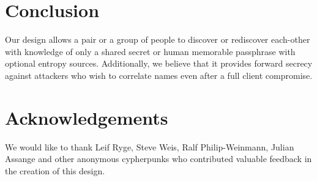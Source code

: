 \documentclass[letterpaper,twocolumn,10pt]{article}
\begin{document}
\section{Conclusion}

Our design allows a pair or a group of people to discover or rediscover
each-other with knowledge of only a shared secret or human memorable
passphrase with optional entropy sources. Additionally, we believe that it
provides forward secrecy against attackers who wish to correlate names even
after a full client compromise.

\section*{Acknowledgements}

We would like to thank Leif Ryge, Steve Weis, Ralf Philip-Weinmann, Julian
Assange and other anonymous cypherpunks who contributed valuable feedback in
the creation of this design.

{\footnotesize 
}
\end{document}
